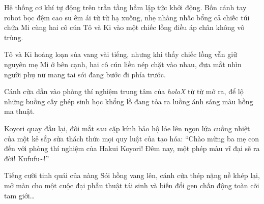 \documentclass[../main.tex]{subfiles}
\begin{document}
Hệ thống cơ khí tự động trên trần tầng hầm lập tức khởi động. Bốn cánh tay robot bọc đệm cao su êm ái từ từ hạ xuống, nhẹ nhàng nhấc bổng cả chiếc túi chứa Mi cùng hai cô cún Tô và Ki vào một chiếc lồng điều áp chân không vô trùng.

Tô và Ki hoảng loạn sủa vang vài tiếng, nhưng khi thấy chiếc lồng vẫn giữ nguyên mẹ Mi ở bên cạnh, hai cô cún liền nép chặt vào nhau, đưa mắt nhìn người phụ nữ mang tai sói đang bước đi phía trước.

Cánh cửa dẫn vào phòng thí nghiệm trung tâm của \textit{holoX} từ từ mở ra, để lộ những buồng cấy ghép sinh học khổng lồ đang tỏa ra luồng ánh sáng màu hồng ma thuật.

Koyori quay đầu lại, đôi mắt sau cặp kính bảo hộ lóe lên ngọn lửa cuồng nhiệt của một kẻ sắp sửa thách thức mọi quy luật của tạo hóa: ``Chào mừng ba mẹ con đến với phòng thí nghiệm của Hakui Koyori! Đêm nay, một phép màu vĩ đại sẽ ra đời! Kufufu\~{}!''

Tiếng cười tinh quái của nàng Sói hồng vang lên, cánh cửa thép nặng nề khép lại, mở màn cho một cuộc đại phẫu thuật tái sinh và biến đổi gen chấn động toàn cõi tam giới\dots
\end{document}
